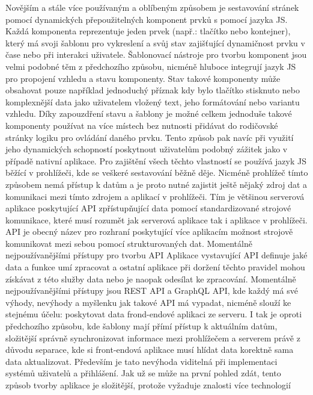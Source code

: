 \begin{itemize}
\begin{itemize}
	Novějším a stále více používaným a oblíbeným způsobem je sestavování stránek pomocí dynamických přepoužitelných
	komponent prvků s pomocí jazyka \ac{JS}.
	Každá komponenta reprezentuje jeden prvek (např.: tlačítko nebo kontejner), který má svoji šablonu pro vykreslení
	a svůj stav zajišťující dynamičnost prvku v čase nebo při interakci uživatele.
	Šablonovací nástroje pro tvorbu komponent jsou velmi podobné těm z předchozího způsobu, nicméně hluboce integrují
	jazyk \ac{JS} pro propojení vzhledu a stavu komponenty.
	Stav takové komponenty může obsahovat pouze například jednoduchý příznak kdy bylo tlačítko stisknuto nebo komplexnější
	data jako uživatelem vložený text, jeho formátování nebo variantu vzhledu.
	Díky zapouzdření stavu a šablony je možné celkem jednoduše takové komponenty používat na více místech bez
	nutnosti přidávat do rodičovské stránky logiku pro ovládání daného prvku.
	Tento způsob pak navíc při využití jeho dynamických schopností poskytnout uživatelům podobný zážitek jako v případě
	nativní aplikace.
	Pro zajištění všech těchto vlastností se používá jazyk \ac{JS} běžící v prohlížeči, kde se veškeré sestavování běžně
	děje.
	Nicméně prohlížeč tímto způsobem nemá přístup k datům a je proto nutné zajistit ještě nějaký zdroj dat a komunikaci
	mezi tímto zdrojem a aplikací v prohlížeči.
	Tím je většinou serverová aplikace poskytující \ac{API} zpřístupňující data pomocí standardizované strojové komunikace,
	které musí rozumět jak serverová aplikace tak i aplikace v prohlížeči.
	\ac{API} je obecný název pro rozhraní poskytující více aplikacím možnost strojově komunikovat mezi sebou pomocí
	strukturovaných dat.
	Momentálně nejpoužívanějšími přístupy pro tvorbu \ac{API}
	Aplikace vystavující \ac{API} definuje jaké data a funkce umí zpracovat a ostatní aplikace při doržení těchto pravidel
	mohou získávat z této služby data nebo je naopak odesílat ke zpracování.
	Momentálně nejpoužívanějšími přístupy jsou \ac{REST} \ac{API} a GraphQL \ac{API}, kde každý má své výhody, nevýhody
	a myšlenku jak takové \ac{API} má vypadat, nicméně slouží ke stejnému účelu: poskytovat data frond-endové aplikaci
	ze serveru.
	I tak je oproti předchozího způsobu, kde šablony mají přímí přístup k aktuálním datům, složitější správně synchronizovat
	informace mezi prohlížečem a serverem právě z důvodu separace, kde si front-endová aplikace musí hlídat data
	korektně sama data aktualizovat.
	Především je tato nevýhoda viditelná při implementaci systémů uživatelů a přihlášení.
	Jak už se může na první pohled zdát, tento způsob tvorby aplikace je složitější, protože vyžaduje znalosti více technologií

\end{itemize}
\end{itemize}
